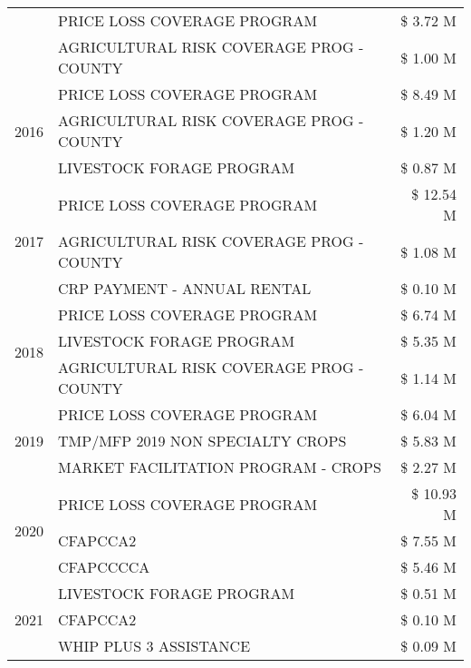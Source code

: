 \begin{tabular}{llr}
 & PRICE LOSS COVERAGE PROGRAM & \$ 3.72 M \\
 & AGRICULTURAL RISK COVERAGE PROG - COUNTY & \$ 1.00 M \\
\cline{1-3}
\multirow[t]{3}{*}{2016} & PRICE LOSS COVERAGE PROGRAM & \$ 8.49 M \\
 & AGRICULTURAL RISK COVERAGE PROG - COUNTY & \$ 1.20 M \\
 & LIVESTOCK FORAGE PROGRAM & \$ 0.87 M \\
\cline{1-3}
\multirow[t]{3}{*}{2017} & PRICE LOSS COVERAGE PROGRAM & \$ 12.54 M \\
 & AGRICULTURAL RISK COVERAGE PROG - COUNTY & \$ 1.08 M \\
 & CRP PAYMENT - ANNUAL RENTAL & \$ 0.10 M \\
\cline{1-3}
\multirow[t]{3}{*}{2018} & PRICE LOSS COVERAGE PROGRAM & \$ 6.74 M \\
 & LIVESTOCK FORAGE PROGRAM & \$ 5.35 M \\
 & AGRICULTURAL RISK COVERAGE PROG - COUNTY & \$ 1.14 M \\
\cline{1-3}
\multirow[t]{3}{*}{2019} & PRICE LOSS COVERAGE PROGRAM & \$ 6.04 M \\
 & TMP/MFP 2019 NON SPECIALTY CROPS & \$ 5.83 M \\
 & MARKET FACILITATION PROGRAM - CROPS & \$ 2.27 M \\
\cline{1-3}
\multirow[t]{3}{*}{2020} & PRICE LOSS COVERAGE PROGRAM & \$ 10.93 M \\
 & CFAPCCA2 & \$ 7.55 M \\
 & CFAPCCCCA & \$ 5.46 M \\
\cline{1-3}
\multirow[t]{3}{*}{2021} & LIVESTOCK FORAGE PROGRAM & \$ 0.51 M \\
 & CFAPCCA2 & \$ 0.10 M \\
 & WHIP PLUS 3 ASSISTANCE & \$ 0.09 M \\
\cline{1-3}
\bottomrule
\end{tabular}
